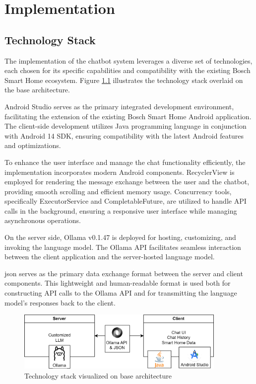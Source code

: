
\chapter{Implementation}
\label{chap:implementation}

\section{Technology Stack}
The implementation of the chatbot system leverages a diverse set of technologies, each chosen for its specific capabilities and compatibility with the existing Bosch Smart Home ecosystem. Figure \ref{fig:techstack} illustrates the technology stack overlaid on the base architecture.

Android Studio serves as the primary integrated development environment, facilitating the extension of the existing Bosch Smart Home Android application. The client-side development utilizes Java programming language in conjunction with Android 14 SDK, ensuring compatibility with the latest Android features and optimizations.

To enhance the user interface and manage the chat functionality efficiently, the implementation incorporates modern Android components. RecyclerView is employed for rendering the message exchange between the user and the chatbot, providing smooth scrolling and efficient memory usage. Concurrency tools, specifically ExecutorService and CompletableFuture, are utilized to handle API calls in the background, ensuring a responsive user interface while managing asynchronous operations.

On the server side, Ollama v0.1.47 is deployed for hosting, customizing, and invoking the language model. The Ollama API facilitates seamless interaction between the client application and the server-hosted language model.

\gls{json} serves as the primary data exchange format between the server and client components. This lightweight and human-readable format is used both for constructing API calls to the Ollama API and for transmitting the language model's responses back to the client.
\begin{figure}[h]
    \centering
    \captionsetup{justification=centering}
    \includegraphics[width=0.9\textwidth]{graphics/techstack.png}
    \caption{Technology stack visualized on base architecture}
    \label{fig:techstack}
\end{figure}

